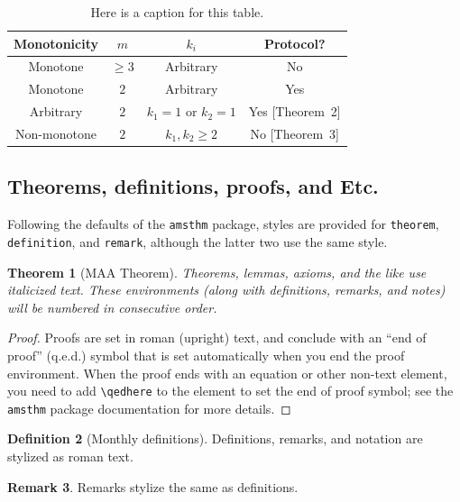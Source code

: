 \documentclass{article}
\theoremstyle{theorem}
\newtheorem{theorem}{Theorem}
\theoremstyle{definition}
\newtheorem{definition}[theorem]{Definition}
\newtheorem{remark}[theorem]{Remark}
\begin{document}
\begin{table}[h!]
\centering
\caption{Here is a caption for this table.}
\begin{tabular}{|c|c|c|c|}
 \hline
\textbf{ Monotonicity }& $m$ & $k_i$ & \textbf{Protocol?} \abrule \\
 \hline
 \hline
Monotone & $\geq 3$ & Arbitrary & No \cite{american} \abrule \\
 \hline
Monotone & $2$ & Arbitrary & Yes \cite{lawrence} \abrule \\
 \hline
 Arbitrary & $2$ & $k_1=1$ or $k_2=1$ & Yes [Theorem~2]  \abrule\\
 \hline
Non-monotone & $2$ & $k_1, k_2\geq 2$& No [Theorem~3]  \abrule\\
 \hline
\end{tabular}
\end{table}

\subsection{Theorems, definitions, proofs, and Etc.}

Following the defaults of the \texttt{amsthm} package, styles are provided for \texttt{theorem}, \texttt{definition}, and \texttt{remark}, although the latter two use the same style.

\begin{theorem}[MAA Theorem]
Theorems, lemmas, axioms, and the like use italicized text. These environments (along with definitions, remarks, and notes) will be numbered in consecutive order.
\end{theorem}

\begin{proof}
Proofs are set in roman (upright) text, and conclude with an ``end of proof'' (q.e.d.) symbol that is set automatically when you end the proof environment.  When the proof ends with an equation or other non-text element, you need to add \verb~\qedhere~ to the element to set the end of proof symbol; see the \texttt{amsthm} package documentation for more details.
\end{proof}

\begin{definition}[Monthly definitions]
Definitions, remarks, and notation are stylized as roman text.  
\end{definition}

\begin{remark}
Remarks stylize the same as definitions.
\end{remark}
\end{document}
